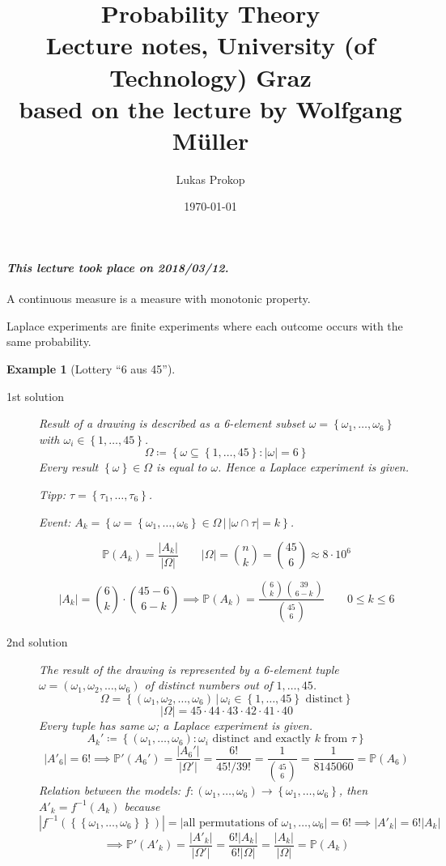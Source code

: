 \documentclass{article}
\title{
  Probability Theory \\
  \large{Lecture notes, University (of Technology) Graz} \\
  based on the lecture by Wolfgang Müller
}
\date{\today}
\author{Lukas Prokop}
\newtheorem{example}{Example}  \numberwithin{example}{section}
\newcommand{\set}[1]{\left\{#1\right\}}
\newcommand{\setdef}[2]{\left\{\left.#1\,\right|\,#2\right\}}
\newcommand{\card}[1]{\left|#1\right|}
\newcommand{\dateref}[1]{\paragraph{\textit{This lecture took place on #1.}}}
\begin{document}
\maketitle
\tableofcontents

\dateref{2018/03/12}

A continuous measure is a measure with monotonic property.

Laplace experiments are finite experiments where each outcome occurs with the same probability.

\begin{example}[Lottery \enquote{6 aus 45}]
  \begin{description}
    \item[1st solution]
      Result of a drawing is described as a 6-element subset $\omega = \set{\omega_1, \dots, \omega_6}$ with $\omega_i \in \set{1, \dots, 45}$.
      \[ \Omega \coloneqq \set{\omega \subseteq \set{1, \dots, 45}: \card{\omega} = 6} \]
      Every result $\set{\omega} \in \Omega$ is equal to $\omega$.
      Hence a Laplace experiment is given.

      Tipp: $\tau = \set{\tau_1, \dots, \tau_6}$.

      Event: $A_k = \setdef{\omega = \set{\omega_1, \dots, \omega_6} \in \Omega}{\card{\omega \cap \tau} = k}$.

      \[ \mathbb P(A_k) = \frac{\card{A_k}}{\card{\Omega}} \qquad \card{\Omega} = {n \choose k} = {45 \choose 6} \approx 8 \cdot 10^6 \]

      \[ \card{A_k} = {6 \choose k} \cdot {45-6 \choose 6-k} \implies \mathbb P(A_k) = \frac{{6 \choose k} {39 \choose 6-k}}{{45 \choose 6}} \qquad 0 \leq k \leq 6 \]
    \item[2nd solution]
      The result of the drawing is represented by a 6-element tuple $\omega = (\omega_1, \omega_2, \dots, \omega_6)$ of distinct numbers out of $1, \dots, 45$.
      \[ \Omega = \setdef{(\omega_1, \omega_2, \dots, \omega_6)}{\omega_i \in \set{1, \dots, 45} \text{ distinct}} \]
      \[ \card{\Omega} = 45 \cdot 44 \cdot 43 \cdot 42 \cdot 41 \cdot 40 \]
      Every tuple has same $\omega$; a Laplace experiment is given.
      \[ A_k' \coloneqq \set{(\omega_1, \dots, \omega_6): \omega_i \text{ distinct and exactly } k \text{ from } \tau } \]
      \[ \card{A'_6} = 6! \implies \mathbb P'(A_6') = \frac{\card{A_6'}}{\card{\Omega'}} = \frac{6!}{45! / 39!} = \frac{1}{{45 \choose 6}} = \frac{1}{8145060} = \mathbb P(A_6) \]
      Relation between the models: $f: (\omega_1, \dots, \omega_6) \to \set{\omega_1, \dots, \omega_6}$, then $A'_k = f^{-1}(A_k)$
      because
      \[
        \card{f^{-1}(\set{\set{\omega_1, \dots, \omega_6}})} = \card{\text{all permutations of } \omega_1, \dots, \omega_6} = 6!
        \implies \card{A'_k} = 6! \card{A_k}
      \] \[
        \implies \mathbb P'(A'_k) = \frac{\card{A'_k}}{\card{\Omega'}} = \frac{6! \card{A_k}}{6! \card{\Omega}} = \frac{\card{A_k}}{\card{\Omega}} = \mathbb P(A_k)
      \]
  \end{description}
\end{example}
\end{document}
